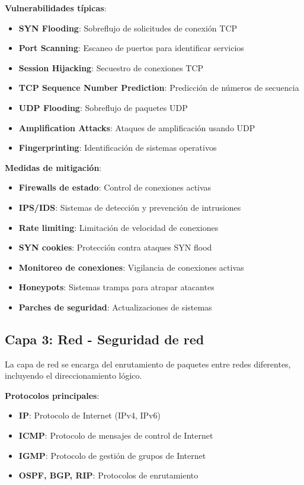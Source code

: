 \textbf{Vulnerabilidades típicas}:
\begin{itemize}
    \item \textbf{SYN Flooding}: Sobreflujo de solicitudes de conexión TCP
    \item \textbf{Port Scanning}: Escaneo de puertos para identificar servicios
    \item \textbf{Session Hijacking}: Secuestro de conexiones TCP
    \item \textbf{TCP Sequence Number Prediction}: Predicción de números de secuencia
    \item \textbf{UDP Flooding}: Sobreflujo de paquetes UDP
    \item \textbf{Amplification Attacks}: Ataques de amplificación usando UDP
    \item \textbf{Fingerprinting}: Identificación de sistemas operativos
\end{itemize}

\textbf{Medidas de mitigación}:
\begin{itemize}
    \item \textbf{Firewalls de estado}: Control de conexiones activas
    \item \textbf{IPS/IDS}: Sistemas de detección y prevención de intrusiones
    \item \textbf{Rate limiting}: Limitación de velocidad de conexiones
    \item \textbf{SYN cookies}: Protección contra ataques SYN flood
    \item \textbf{Monitoreo de conexiones}: Vigilancia de conexiones activas
    \item \textbf{Honeypots}: Sistemas trampa para atrapar atacantes
    \item \textbf{Parches de seguridad}: Actualizaciones de sistemas
\end{itemize}

\subsection{Capa 3: Red - Seguridad de red}

La capa de red se encarga del enrutamiento de paquetes entre redes diferentes, incluyendo el direccionamiento lógico.

\textbf{Protocolos principales}:
\begin{itemize}
    \item \textbf{IP}: Protocolo de Internet (IPv4, IPv6)
    \item \textbf{ICMP}: Protocolo de mensajes de control de Internet
    \item \textbf{IGMP}: Protocolo de gestión de grupos de Internet
    \item \textbf{OSPF, BGP, RIP}: Protocolos de enrutamiento
\end{itemize}

